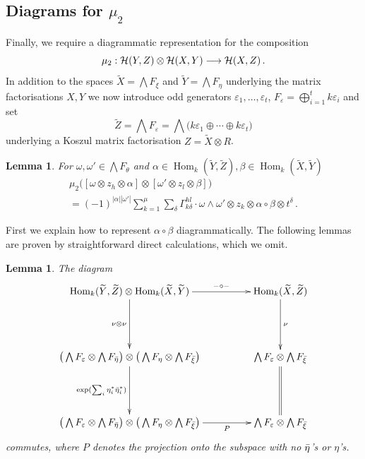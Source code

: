 \documentclass[english,letter paper,12pt,leqno]{article}
\newtheorem{lemma}[theorem]{Lemma}
\theoremstyle{example}
\numberwithin{equation}{section}
\def\HH{\HH}
\def\HH{\mathcal{H}}
\def\Hom{\operatorname{Hom}}
\def\be{\begin{equation}}
\def\ee{\end{equation}}
\begin{document}
\subsection{Diagrams for $\mu_2$}\label{section:feynman_diagram_3}

Finally, we require a diagrammatic representation for the composition
\[
\mu_2: \HH(Y, Z) \otimes \HH(X, Y) \lto \HH(X,Z)\,.
\]
In addition to the spaces $\widetilde{X} = \bigwedge F_\xi$ and $\widetilde{Y} = \bigwedge F_\eta$ underlying the matrix factorisations $X,Y$ we now introduce odd generators $\varepsilon_1,\ldots,\varepsilon_t$, $F_\varepsilon = \bigoplus_{i=1}^t k \varepsilon_i$ and set
\[
\widetilde{Z} = \bigwedge F_\varepsilon = \bigwedge\big( k \varepsilon_1 \oplus \cdots \oplus k \varepsilon_t \big)
\]
underlying a Koszul matrix factorisation $Z = \widetilde{X} \otimes R$. 

\begin{lemma}\label{lemma_mu2presentation} For $\omega, \omega' \in \bigwedge F_\theta$ and $\alpha \in \Hom_k(\widetilde{Y}, \widetilde{Z}), \beta \in \Hom_k(\widetilde{X}, \widetilde{Y})$
\begin{gather*}
\mu_2\Big( [ \omega \otimes z_h \otimes \alpha ] \otimes [ \omega' \otimes z_l \otimes \beta ] \Big) \\
= (-1)^{|\alpha||\omega'|} \sum_{k=1}^\mu \sum_{\delta} \Gamma^{hl}_{k \delta} \cdot \omega \wedge \omega' \otimes z_k \otimes \alpha \circ \beta \otimes t^{\delta}\,.
\end{gather*}
\end{lemma}

First we explain how to represent $\alpha \circ \beta$ diagrammatically. The following lemmas are proven by straightforward direct calculations, which we omit.

\begin{lemma}\label{lemma:mixedr2_0} The diagram
\be
\xymatrix@C+2pc@R+2pc{
\Hom_k( \widetilde{Y}, \widetilde{Z} ) \otimes \Hom_k( \widetilde{X}, \widetilde{Y} ) \ar[d]_-{\nu \otimes \nu} \ar[r]^-{- \circ -} & \Hom_k( \widetilde{X}, \widetilde{Z} ) \ar[d]^-\nu\\
\big( \bigwedge F_\varepsilon \otimes \bigwedge F_{\Bar{\eta}} \big) \otimes \big( \bigwedge F_\eta \otimes \bigwedge F_{\Bar{\xi}} \big) \ar[d]_-{\exp( \sum_i \eta_i^* \Bar{\eta}_i^* )} & \bigwedge F_\varepsilon \otimes \bigwedge F_{\Bar{\xi}} \ar@{=}[d]\\
\big( \bigwedge F_\varepsilon \otimes \bigwedge F_{\Bar{\eta}} \big) \otimes \big( \bigwedge F_\eta \otimes \bigwedge F_{\Bar{\xi}} \big) \ar[r]_-P & \bigwedge F_\varepsilon \otimes \bigwedge F_{\Bar{\xi}}
}
\ee
commutes, where $P$ denotes the projection onto the subspace with no $\Bar{\eta}$'s or $\eta$'s.
\end{lemma}
\end{document}
